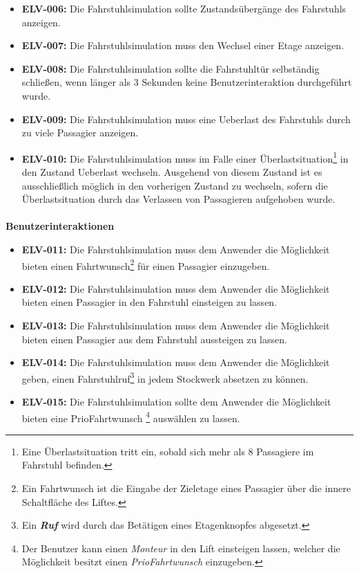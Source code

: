 \newpage
\begin{itemize}
	\item \textbf{ELV-006:} \newline
		Die \gls{Fahrstuhlsimulation} sollte Zustandsübergänge des Fahrstuhls anzeigen.
	\item \textbf{ELV-007:} \newline
		Die \gls{Fahrstuhlsimulation} muss den Wechsel einer Etage anzeigen.
	\item \textbf{ELV-008:} \newline
		Die \gls{Fahrstuhlsimulation} sollte die Fahrstuhltür selbständig schließen, wenn 
		länger als 3 Sekunden keine Benutzerinteraktion durchgeführt wurde.
	\item \textbf{ELV-009:} \newline
		Die \gls{Fahrstuhlsimulation} muss eine \gls{Ueberlast} des Fahrstuhls durch zu 
		viele \gls{Passagier} anzeigen.
	\item \textbf{ELV-010:} \newline
		Die \gls{Fahrstuhlsimulation} muss im Falle einer Überlastsituation\footnote{Eine Überlastsituation tritt ein, sobald sich mehr als 8 Passagiere im Fahrstuhl befinden.} in den Zustand \gls{Ueberlast} wechseln. Ausgehend von diesem Zustand  ist es ausschließlich möglich in den vorherigen Zustand zu wechseln, sofern die Überlastsituation durch das Verlassen von Passagieren aufgehoben wurde.
\end{itemize}

\newpage
\paragraph{}
\textbf{Benutzerinteraktionen}
\begin{itemize}
	\item \textbf{ELV-011:}
		Die \gls{Fahrstuhlsimulation} muss dem Anwender die Möglichkeit bieten einen \gls{Fahrtwunsch}\footnote{Ein \gls{Fahrtwunsch} ist die Eingabe der Zieletage eines \gls{Passagier} über die innere Schaltfläche des Liftes.} für einen \gls{Passagier} einzugeben.
	\item \textbf{ELV-012:}
		Die \gls{Fahrstuhlsimulation} muss dem Anwender die Möglichkeit bieten einen \gls{Passagier} in den Fahrstuhl einsteigen zu lassen.
	\item \textbf{ELV-013:}
		Die \gls{Fahrstuhlsimulation} muss dem Anwender die Möglichkeit bieten einen \gls{Passagier} aus dem Fahrstuhl aussteigen zu lassen.
	\item \textbf{ELV-014:}
		Die \gls{Fahrstuhlsimulation} muss dem Anwender die Möglichkeit geben, einen \gls{Fahrstuhlruf}\footnote{Ein \textbf{\textit{Ruf}} wird durch das Betätigen eines Etagenknopfes abgesetzt.} in jedem Stockwerk absetzen zu können.
	\item \textbf{ELV-015:}
		Die \gls{Fahrstuhlsimulation} sollte dem Anwender die Möglichkeit bieten eine \gls{PrioFahrtwunsch} \footnote{Der Benutzer kann einen \textit{\gls{Monteur}} in den Lift einsteigen lassen, welcher die Möglichkeit besitzt einen \textit{\gls{PrioFahrtwunsch}} einzugeben.} auswählen zu lassen.
\end{itemize}

